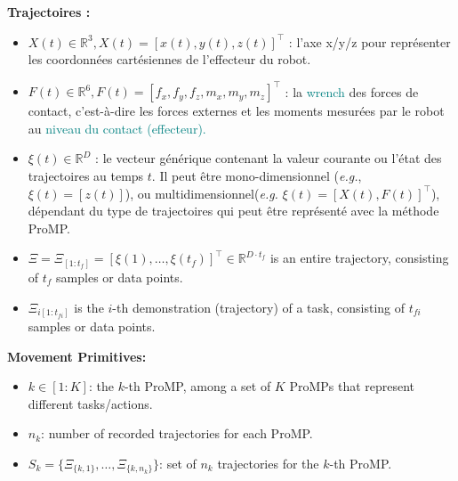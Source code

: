 \documentclass[utf8]{frontiersSCNS} %
\newcommand{\toimprove}[1]{\textcolor{teal}{#1}}
\begin{document}
\noindent
\textbf{Trajectoires :}
\begin{itemize}
	\item $X(t)\in \mathbb{R}^3, X(t) = [x(t), y(t), z(t)]^\top$ : l'axe x/y/z pour représenter les coordonnées cartésiennes de l'effecteur du robot.
	\item $F(t) \in \mathbb{R}^6, F(t) = [f_x, f_y, f_z, m_x, m_y, m_z]^\top$ : la \toimprove{wrench} des forces de contact, c'est-à-dire les forces externes et les moments mesurées par le robot au \toimprove{niveau du contact (effecteur).}
	\item $\xi(t) \in \mathbb{R}^D$ : le vecteur générique contenant la valeur courante ou l'état des trajectoires au temps $t$. 
	Il peut être mono-dimensionnel (\textit{e.g.}, $\xi(t) = [z(t)]$), ou multidimensionnel(\textit{e.g.} $\xi(t) = [X(t), F(t)]^\top$), dépendant du type de trajectoires qui peut être représenté avec la méthode ProMP.
	
	
	\item $\Xi = \Xi_{[1:t_{f}]} = [\xi(1), \ldots, \xi(t_{f})]^\top \in \mathbb{R}^{D \cdot t_{f}}$ is an entire trajectory, consisting of $t_f$ samples or data points. 
	
	\item $\Xi_{i[1:t_{fi}]}$ is the $i$-th demonstration (trajectory) of a task, consisting of $t_{fi}$ samples or data points. 
	
	
\end{itemize}
\textbf{Movement Primitives:}
\begin{itemize}
	\item $k \in [1:K]$: the $k$-th ProMP, among a set of $K$ ProMPs that represent different tasks/actions. 
	\item $n_k$: number of recorded trajectories for each ProMP.
	\item $S_k = \{\Xi_{\{k,1\}},\ldots,\Xi_{\{k,n_k\}}\}$: set of $n_k$ trajectories for the $k$-th ProMP. 
\end{itemize}
\end{document}
